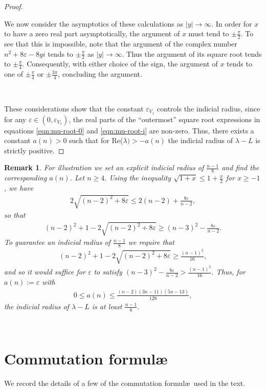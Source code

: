 \documentclass[10pt,reqno]{amsart}
\newtheorem{remark}[theorem]{Remark}
\newcommand{\vep}{\varepsilon}
\begin{document}
\begin{proof}
\

We now consider the asymptotics of these calculations as $|y| \to \infty$.  In order for $x$  to have a zero real part asymptotically, the argument of $x$ must tend to $\pm\frac{\pi}{2}$. To see that this is impossible, note that the argument of the complex number $n^2 + 8\vep - 8 y i$ tends to $\pm \frac{\pi}{2}$ as $|y| \to \infty$.  Thus the argument of its square root tends to $\pm \frac{\pi}{4}$.  Consequently, with either choice of the sign, the argument of $x$ tends to one of $\pm \frac{\pi}{4}$ or $\pm \frac{3\pi}{4}$, concluding the argument.

\

These considerations show that the constant $\vep_{V_1}$ controls the indicial radius, since for any $\vep \in (0,\vep_{V_1})$, the real parts of the ``outermost'' square root expressions in equations \eqref{eqn:mu-root-0} and \eqref{eqn:mu-root-i} are non-zero. Thus, there exists a constant $a(n) > 0$ such that for Re($\lambda) > -a(n)$ the indicial radius of $\lambda - L$ is strictly positive. 

\end{proof}

\begin{remark}
\label{rem:ind-poly}
For illustration we set an explicit indicial radius of $\frac{n-1}{8}$ and find the corresponding $a(n)$. Let $n \ge 4$.
Using the inequality $\sqrt{1 + x} \leq 1+ \frac{x}{2}$ for $x\geq -1$, we have
\begin{align*}
2 \sqrt{ (n-2)^2 + 8 \vep } \leq 2(n-2) + \frac{8\vep}{n-2},
\end{align*}
so that
\begin{align*}
(n-2)^2+1-2\sqrt{ (n-2)^2 + 8 \vep} \geq (n-3)^2 - \frac{8 \vep}{n-2}.
\end{align*}
To guarantee an indicial radius of $\frac{n-1}{8}$ we require that
\begin{align*}
(n-2)^2+1-2\sqrt{ (n-2)^2 + 8 \vep} \geq \frac{(n-1)^2}{16},
\end{align*}
and so it would suffice for $\vep$ to satisfy 
$(n-3)^2 - \frac{8 \vep}{n-2} > \frac{(n-1)^2}{16}$. 
Thus, for $a(n):=\vep$ with
\begin{align*}
0 \leq a(n) \leq \frac{(n-2)(3n-11)(5n-13)}{128},
\end{align*}
the indicial radius of $\lambda - L$ is at least $\frac{n-1}{8}.$ 

\end{remark}
\
\section{Commutation formul\ae} \label{sec:techappendix}
We record the details of a few of the commutation formul\ae\ used in the text.
\end{document}
